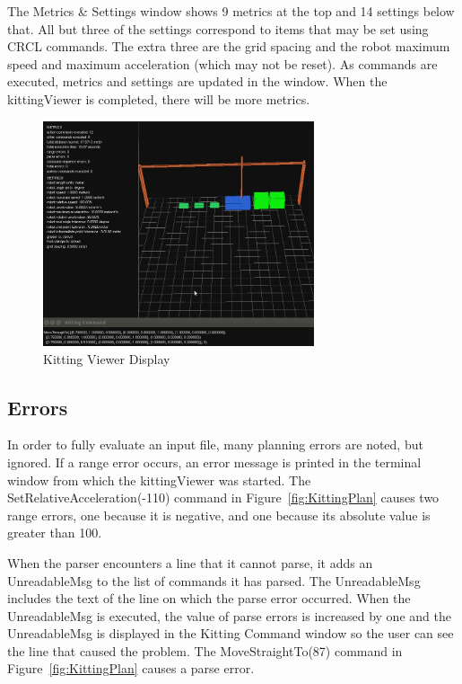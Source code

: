 The Metrics \& Settings window shows 9 metrics at the top and 14 settings
below that. All but three of the settings correspond to items that may be
set using CRCL commands. The extra three are the grid spacing and the robot
maximum speed and maximum acceleration (which may not be reset). As
commands are executed, metrics and settings are updated in the window.
When the kittingViewer is completed, there will be more metrics.
\begin{figure}[ht!]
\begin{center}
\includegraphics[width=8cm]{images/kittingViewer.jpg}
\caption{Kitting Viewer Display}
\label{fig:KittingViewer}
\end{center}
\end{figure}

\subsection{Errors}
In order to fully evaluate an input file, many planning errors are noted, but
ignored.
 If a range error
  occurs, an error message is printed in the terminal window from which the
  kittingViewer was started. The \sf SetRelativeAcceleration(-110) \rm
  command in Figure~\ref{fig:KittingPlan} causes two range errors, one
  because it is negative, and one because its absolute value is greater
  than 100.
  
  When the parser
  encounters a line that it cannot parse, it adds an \sf UnreadableMsg \rm to the
  list of commands it has parsed. The \sf UnreadableMsg \rm includes the text of
  the line on which the parse error occurred. When the \sf UnreadableMsg \rm is
  executed, the value of parse errors is increased by one and the
 \sf  UnreadableMsg \rm is displayed in the Kitting Command window so the user can
  see the line that caused the problem. The \sf MoveStraightTo(87) \rm
  command in Figure~\ref{fig:KittingPlan} causes a parse error.\\
  
